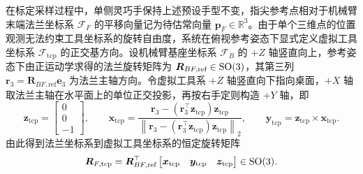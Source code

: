 在标定采样过程中，单侧灵巧手保持上述预设手型不变，指尖参考点相对于机械臂末端法兰坐标系 $\mathcal{F}_F$ 的平移向量记为待估常向量 $\bm{p}_F \in \mathbb{R}^3$。由于单个三维点的位置观测无法约束工具坐标系的旋转自由度，系统在俯视参考姿态下显式定义虚拟工具坐标系 $\mathcal{F}_{\text{tcp}}$ 的正交基方向。设机械臂基座坐标系 $\mathcal{F}_B$ 的 $+Z$ 轴竖直向上，参考姿态下由正运动学求得的法兰旋转矩阵为 $\bm{R}_{BF,\text{ref}} \in \mathrm{SO}(3)$，其第三列 $\bm{r}_3 = \bm{R}_{BF,\text{ref}}\bm{e}_3$ 为法兰主轴方向。令虚拟工具系 $+Z$ 轴竖直向下指向桌面，$+X$ 轴取法兰主轴在水平面上的单位正交投影，再按右手定则构造 $+Y$ 轴，即
\begin{equation}
  \bm{z}_{\text{tcp}} = \begin{bmatrix} 0 \\ 0 \\ -1 \end{bmatrix}, \qquad
  \bm{x}_{\text{tcp}} = \frac{\bm{r}_3 - (\bm{r}_3^{\top}\bm{z}_{\text{tcp}})\bm{z}_{\text{tcp}}}{\left\|\bm{r}_3 - (\bm{r}_3^{\top}\bm{z}_{\text{tcp}})\bm{z}_{\text{tcp}}\right\|_2}, \qquad
  \bm{y}_{\text{tcp}} = \bm{z}_{\text{tcp}} \times \bm{x}_{\text{tcp}}.
  \label{eq:tcp-axes}
\end{equation}
由此得到法兰坐标系到虚拟工具坐标系的恒定旋转矩阵
\begin{equation}
  \bm{R}_{F,\text{tcp}} = \bm{R}_{BF,\text{ref}}^{\top} \begin{bmatrix} \bm{x}_{\text{tcp}} & \bm{y}_{\text{tcp}} & \bm{z}_{\text{tcp}} \end{bmatrix} \in \mathrm{SO}(3).
  \label{eq:flange-from-tcp-rot}
\end{equation}

